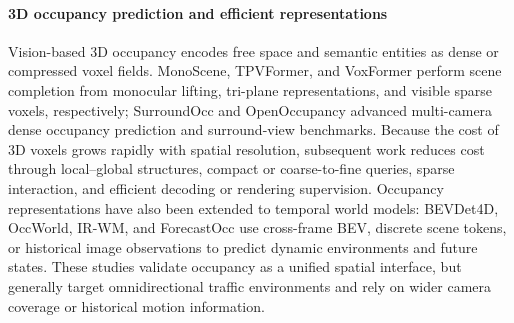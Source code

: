 \documentclass[a4paper,fleqn]{cas-sc}
\begin{document}
\paragraph{3D occupancy prediction and efficient representations}
Vision-based 3D occupancy encodes free space and semantic entities as dense or compressed voxel fields. MonoScene, TPVFormer, and VoxFormer perform scene completion from monocular lifting, tri-plane representations, and visible sparse voxels, respectively\citep{cao2022monoscene,huang2023tpvformer,li2023voxformer}; SurroundOcc and OpenOccupancy advanced multi-camera dense occupancy prediction and surround-view benchmarks\citep{wei2023surroundocc,wang2023openoccupancy}. Because the cost of 3D voxels grows rapidly with spatial resolution, subsequent work reduces cost through local--global structures, compact or coarse-to-fine queries, sparse interaction, and efficient decoding or rendering supervision\citep{zhang2023occformer,ma2024cotr,wang2024panoocc,liu2024sparseocc,tang2024sparseocc,yu2023flashocc,pan2024renderocc}. Occupancy representations have also been extended to temporal world models: BEVDet4D, OccWorld, IR-WM, and ForecastOcc use cross-frame BEV, discrete scene tokens, or historical image observations to predict dynamic environments and future states\citep{huang2022bevdet4d,zheng2024occworld,mei2025irwm,mohan2026forecastocc}. These studies validate occupancy as a unified spatial interface, but generally target omnidirectional traffic environments and rely on wider camera coverage or historical motion information.
\end{document}
